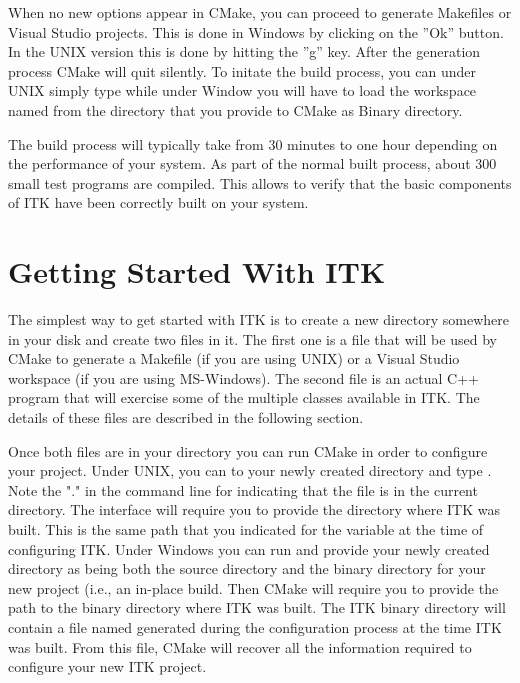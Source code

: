 When no new options appear in CMake, you can proceed to generate Makefiles or
Visual Studio projects. This is done in Windows by clicking on the ''Ok''
button.  In the UNIX version this is done by hitting the ''g'' key. After the
generation process CMake will quit silently. To initate the build
process, you can under UNIX simply type  while under Window you
will have to load the workspace named  from the directory that
you provide to CMake as Binary directory.

The build process will typically take from 30 minutes to one hour depending
on the performance of your system. As part of the normal built process, about
300 small test programs are compiled. This allows to verify that the basic
components of ITK have been correctly built on your system.

\section{Getting Started With ITK }
\label{sec:GettingStartedWithITK}
 
The simplest way to get started with ITK is to create a new directory
somewhere in your disk and create two files in it. The first one is a
 file that will be used by CMake to generate a Makefile
(if you are using UNIX) or a Visual Studio workspace (if you are using
MS-Windows).  The second file is an actual C++ program that will exercise
some of the multiple classes available in ITK. The details of these files
are described in the following section.

Once both files are in your directory you can run CMake in order to configure
your project. Under UNIX, you can  to your newly created directory
and type . Note the "." in the command line for indicating
that the  file is in the current directory. The
 interface will require you to provide the directory where ITK
was built. This is the same path that you indicated for the
 variable at the time of configuring ITK. Under
Windows you can run  and provide your newly created
directory as being both the source directory and the binary directory for
your new project (i.e., an in-place build. Then CMake will require you to
provide the path to the binary directory where ITK was built. The ITK binary
directory will contain a file named  generated during the
configuration process at the time ITK was built.  From this file, CMake will
recover all the information required to configure your new ITK project.


